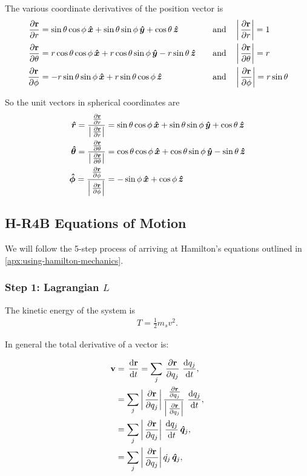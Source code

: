 The various coordinate derivatives of the position vector is
\begin{align}
    \pd{\vec{r}}{r} &= \sin{\theta}\cos{\phi} \xhat + \sin{\theta}\sin{\phi} \yhat + \cos{\theta} \zhat \quad &\text{and} \quad &\left| \pd{\vec{r}}{r} \right| = 1 \label{eq:position-derived-r} \\
    \pd{\vec{r}}{\theta} &= r \cos{\theta}\cos{\phi} \xhat + r \cos{\theta}\sin{\phi} \yhat - r \sin{\theta} \zhat \quad &\text{and} \quad &\left| \pd{\vec{r}}{\theta} \right| = r \label{eq:position-derived-theta} \\
    \pd{\vec{r}}{\phi} &= -r\sin{\theta}\sin{\phi} \xhat + r\sin{\theta}\cos{\phi} \zhat \quad &\text{and} \quad &\left| \pd{\vec{r}}{\phi} \right| = r\sin{\theta} \label{eq:position-derived-phi}
\end{align}

So the unit vectors in spherical coordinates are
\begin{align}
    \rhat = \dfrac{\pd{\vec{r}}{r}}{\left| \pd{\vec{r}}{r} \right| } &= \sin{\theta}\cos{\phi} \xhat + \sin{\theta}\sin{\phi} \yhat + \cos{\theta} \zhat \label{eq:r-hat}\\
    \thetahat = \dfrac{\pd{\vec{r}}{\theta}}{\left| \pd{\vec{r}}{\theta} \right| } &= \cos{\theta}\cos{\phi} \xhat + \cos{\theta}\sin{\phi} \yhat - \sin{\theta} \zhat \label{eq:theta-hat}\\
    \phihat = \dfrac{\pd{\vec{r}}{\phi}}{\left| \pd{\vec{r}}{\phi} \right| } &= -\sin{\phi} \xhat + \cos{\phi} \zhat \label{eq:phi-hat}
\end{align}

\subsection{H-R4B Equations of Motion}
We will follow the 5-step process of arriving at Hamilton's equations outlined in \cref{apx:using-hamilton-mechanics}.

\subsubsection{Step 1: Lagrangian \(L\)}
The kinetic energy of the system is
\begin{align}
    T = \frac{1}{2} m_s v^2.
\end{align}

In general the total derivative of a vector is:

\begin{align}
    \mathbf{v} &= \operatorname{}\frac{\mathrm{d} \mathbf{r}}{\mathrm{d} t} = \sum\limits_{j} \operatorname{}\frac{\partial \mathbf{r}}{\partial q_j} \operatorname{}\frac{\mathrm{d} q_j}{\mathrm{d} t}, \\
      &= \sum\limits_{j} \left|\operatorname{}\frac{\partial \mathbf{r}}{\partial q_j}\right| \frac{\operatorname{}\frac{\partial \mathbf{r}}{\partial q_j}}{\left|\operatorname{}\frac{\partial \mathbf{r}}{\partial q_j}\right|} \operatorname{}\frac{\mathrm{d} q_j}{\mathrm{d} t}, \\
      &= \sum\limits_{j} \left|\operatorname{}\frac{\partial \mathbf{r}}{\partial q_j}\right| \operatorname{}\frac{\mathrm{d} q_j}{\mathrm{d} t} \operatorname{}\!\bm{\hat{q}}_j, \\
      &= \sum\limits_{j} \left|\operatorname{}\frac{\partial \mathbf{r}}{\partial q_j}\right| \dot{q_j} \operatorname{}\!\bm{\hat{q}}_j,
    \end{align}

